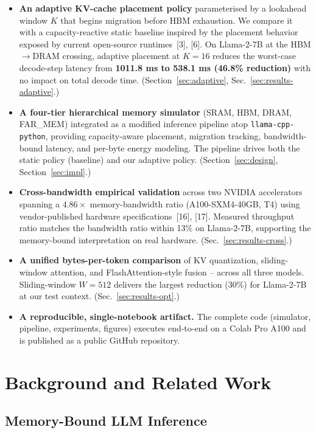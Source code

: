 \documentclass[conference]{IEEEtran}
\begin{document}
\begin{itemize}
\item \textbf{An adaptive KV-cache placement policy} parameterised by a lookahead window $K$ that begins migration before HBM exhaustion. We compare it with a capacity-reactive static baseline inspired by the placement behavior exposed by current open-source runtimes~[3], [6]. On Llama-2-7B at the HBM$\rightarrow$DRAM crossing, adaptive placement at $K=16$ reduces the worst-case decode-step latency from \textbf{1011.8 ms to 538.1 ms (46.8\% reduction)} with no impact on total decode time. (Section~\ref{sec:adaptive}, Sec.~\ref{sec:results-adaptive}.)
\item \textbf{A four-tier hierarchical memory simulator} (SRAM, HBM, DRAM, FAR\_MEM) integrated as a modified inference pipeline atop \texttt{llama-cpp-python}, providing capacity-aware placement, migration tracking, bandwidth-bound latency, and per-byte energy modeling. The pipeline drives both the static policy (baseline) and our adaptive policy. (Section~\ref{sec:design}, Section~\ref{sec:impl}.)
\item \textbf{Cross-bandwidth empirical validation} across two NVIDIA accelerators spanning a $4.86\times$ memory-bandwidth ratio (A100-SXM4-40GB, T4) using vendor-published hardware specifications~[16], [17]. Measured throughput ratio matches the bandwidth ratio within 13\% on Llama-2-7B, supporting the memory-bound interpretation on real hardware. (Sec.~\ref{sec:results-cross}.)
\item \textbf{A unified bytes-per-token comparison} of KV quantization, sliding-window attention, and FlashAttention-style fusion -- across all three models. Sliding-window $W=512$ delivers the largest reduction (30\%) for Llama-2-7B at our test context. (Sec.~\ref{sec:results-opt}.)
\item \textbf{A reproducible, single-notebook artifact.} The complete code (simulator, pipeline, experiments, figures) executes end-to-end on a Colab Pro A100 and is published as a public GitHub repository.
\end{itemize}

\section{Background and Related Work}

\subsection{Memory-Bound LLM Inference}
\end{document}
